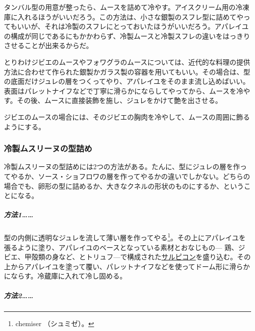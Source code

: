 \begin{recette}
タンバル型の用意が整ったら、ムースを詰めて冷やす。アイスクリーム用の冷凍庫に入れるほうがいいだろう。この方法は、小さな銀製のスフレ型に詰めてやってもいいが、それは冷製のスフレにとっておいたほうがいいだろう。アパレイユの構成が同じであるにもかかわらず、冷製ムースと冷製スフレの違いをはっきりさせることが出来るからだ。

とりわけジビエのムースやフォワグラのムースについては、近代的な料理の提供方法に合わせて作られた銀製かガラス製の容器を用いてもいい。その場合は、型の底面だけジュレの層をつくってやり、アパレイユをそのまま流し込めばいい。表面はパレットナイフなどで丁寧に滑らかにならしてやってから、ムースを冷やす。その後、ムースに直接装飾を施し、ジュレをかけて艶を出させる。

ジビエのムースの場合には、そのジビエの胸肉を冷やして、ムースの周囲に飾るようにする。

\hypertarget{moulage-des-mousselines-froides}{%
\subsubsection{冷製ムスリーヌの型詰め}\label{moulage-des-mousselines-froides}}




冷製ムスリーヌの型詰めには2つの方法がある。たんに、型にジュレの層を作ってやるか、ソース・ショフロワの層を作ってやるかの違いでしかない。どちらの場合でも、卵形の型に詰めるか、大きなクネルの形状のものにするか、ということになる。

\hypertarget{procede-un-moulage-des-mousselines-froides}{%
\subparagraph{方法1\ldots{}\ldots{}}\label{procede-un-moulage-des-mousselines-froides}}

型の内側に透明なジュレを流して薄い層を作ってやる\footnote{chemiser
  （シュミゼ）。}。その上にアパレイユを張るように塗り、アパレイユのベースとなっている素材とおなじもの---
鶏、ジビエ、甲殻類の身など、とトリュフ---で構成された\protect\hyperlink{salpicons-divers}{サルピコン}を盛り込む。その上からアパレイユを塗って覆い、パレットナイフなどを使ってドーム形に滑らかにならす。冷蔵庫に入れて冷し固める。

\hypertarget{procede-deux-moulage-des-mousselines-froides}{%
\subparagraph{方法2\ldots{}\ldots{}}\label{procede-deux-moulage-des-mousselines-froides}}


\end{recette}
